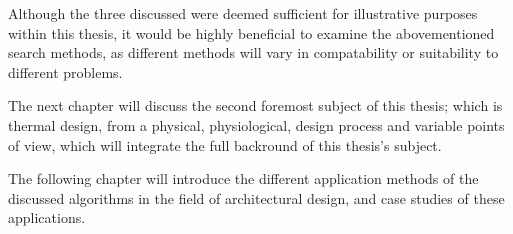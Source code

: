 Although the three discussed were deemed sufficient for illustrative purposes within this thesis, it would be highly beneficial to examine the abovementioned search methods, as different methods will vary in compatability or suitability to different problems.

The next chapter will discuss the second foremost subject of this thesis; which is thermal design, from a physical, physiological, design process and variable points of view, which will integrate the full backround of this thesis's subject. 

The following chapter will introduce the different application methods of the discussed algorithms in the field of architectural design, and case studies of these applications.
